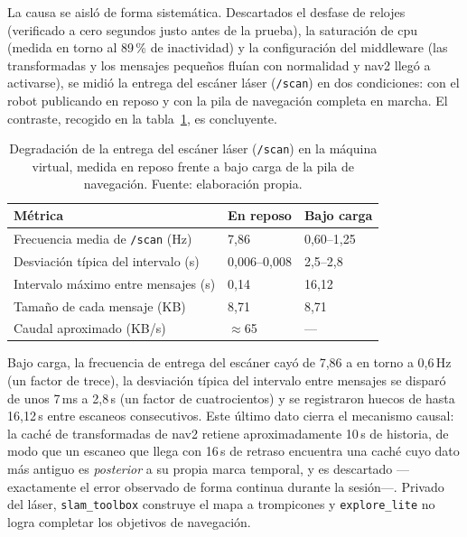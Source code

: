La causa se aisló de forma sistemática. Descartados el desfase de relojes (verificado a cero
segundos justo antes de la prueba), la saturación de \gls{cpu} (medida en torno al 89\,\% de
inactividad) y la configuración del middleware (las transformadas y los mensajes pequeños
fluían con normalidad y \gls{nav2} llegó a activarse), se midió la entrega del escáner láser
(\texttt{/scan}) en dos condiciones: con el robot publicando en reposo y con la pila de
navegación completa en marcha. El contraste, recogido en la tabla~\ref{tab:metricas-real-red},
es concluyente.

\begin{table}[htbp]
  \centering
  \small
  \caption{Degradación de la entrega del escáner láser (\texttt{/scan}) en la máquina virtual,
    medida en reposo frente a bajo carga de la pila de navegación. Fuente: elaboración propia.}
  \label{tab:metricas-real-red}
  \begin{tabular}{@{}>{\raggedright\arraybackslash}p{7.2cm} l l@{}}
    \toprule
    \textbf{Métrica} & \textbf{En reposo} & \textbf{Bajo carga} \\
    \midrule
    Frecuencia media de \texttt{/scan} (Hz)          & 7,86        & 0,60--1,25 \\
    Desviación típica del intervalo (s)              & 0,006--0,008 & 2,5--2,8 \\
    Intervalo máximo entre mensajes (s)              & 0,14        & 16,12 \\
    Tamaño de cada mensaje (KB)                      & 8,71        & 8,71 \\
    Caudal aproximado (KB/s)                         & $\approx$65  & --- \\
    \bottomrule
  \end{tabular}
\end{table}

Bajo carga, la frecuencia de entrega del escáner cayó de 7,86 a en torno a 0,6\,Hz (un factor
de trece), la desviación típica del intervalo entre mensajes se disparó de unos 7\,ms a 2,8\,s
(un factor de cuatrocientos) y se registraron huecos de hasta 16,12\,s entre escaneos
consecutivos. Este último dato cierra el mecanismo causal: la caché de transformadas de
\gls{nav2} retiene aproximadamente 10\,s de historia, de modo que un escaneo que llega con
16\,s de retraso encuentra una caché cuyo dato más antiguo es \emph{posterior} a su propia
marca temporal, y es descartado —exactamente el error observado de forma continua durante la
sesión—. Privado del láser, \texttt{slam\_toolbox} construye el mapa a trompicones y
\texttt{explore\_lite} no logra completar los objetivos de navegación.

